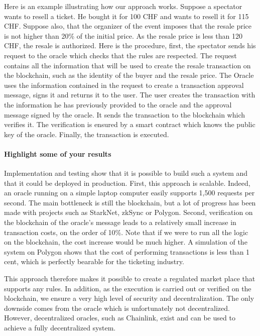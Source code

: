 \documentclass[a4paper,11pt,oneside]{report}
\begin{document}
Here is an example illustrating how our approach works. Suppose a spectator wants to resell a ticket. He bought it for 100 CHF and wants to resell it for 115 CHF. Suppose also, that the organizer of the event imposes that the resale price is not higher than 20\% of the initial price. As the resale price is less than 120 CHF, the resale is authorized. Here is the procedure, first, the spectator sends his request to the oracle which checks that the rules are respected. The request contains all the information that will be used to create the resale transaction on the blockchain, such as the identity of the buyer and the resale price. The Oracle uses the information contained in the request to create a transaction approval message, signs it and returns it to the user. The user creates the transaction with the information he has previously provided to the oracle and the approval message signed by the oracle. It sends the transaction to the blockchain which verifies it. The verification is ensured by a smart contract which knows the public key of the oracle. Finally, the transaction is executed.

\paragraph{Highlight some of your results} Implementation and testing show that it is possible to build such a system and that it could be deployed in production. First, this approach is scalable. Indeed, an oracle running on a simple laptop computer easily supports 1,500 requests per second. The main bottleneck is still the blockchain, but a lot of progress has been made with projects such as StarkNet, zkSync or Polygon. Second, verification on the blockchain of the oracle's message leads to a relatively small increase in transaction costs, on the order of 10\%. Note that if we were to run all the logic on the blockchain, the cost increase would be much higher. A simulation of the system on Polygon shows that the cost of performing transactions is less than 1 cent, which is perfectly bearable for the ticketing industry.

This approach therefore makes it possible to create a regulated market place that supports any rules. In addition, as the execution is carried out or verified on the blockchain, we ensure a very high level of security and decentralization. The only downside comes from the oracle which is unfortunately not decentralized. However, decentralized oracles, such as Chainlink, exist and can be used to achieve a fully decentralized system.
\end{document}
